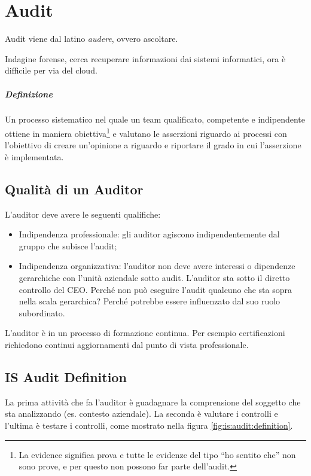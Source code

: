 \chapter{Audit}
\label{audit}

Audit viene dal latino \textit{audere}, ovvero ascoltare.

Indagine forense, cerca recuperare informazioni dai sistemi informatici, ora è
difficile per via del cloud.

\paragraph*{Definizione}

Un processo sistematico nel quale un team qualificato, competente e
indipendente ottiene in maniera obiettiva\footnote{La evidence significa prova e
tutte le evidenze del tipo ``ho sentito che'' non sono prove, e per questo non
possono far parte dell'audit.} e valutano le asserzioni riguardo ai processi
con l'obiettivo di creare un'opinione a riguardo e riportare il grado in cui
l'asserzione è implementata.


\section{Qualità di un Auditor}

L'auditor deve avere le seguenti qualifiche:
\begin{itemize}
\item Indipendenza professionale: gli auditor agiscono indipendentemente dal
gruppo che subisce l'audit;
\item Indipendenza organizzativa: l'auditor non deve avere interessi o
dipendenze gerarchiche con l'unità aziendale sotto audit. L'auditor sta sotto
il diretto controllo del CEO. Perché non può eseguire l'audit qualcuno che sta
sopra nella scala gerarchica? Perché potrebbe essere influenzato dal suo ruolo
subordinato.
\end{itemize}

L'auditor è in un processo di formazione continua. Per esempio certificazioni
richiedono continui aggiornamenti dal punto di vista professionale.

\section{IS Audit Definition}

La prima attività che fa l'auditor è guadagnare la comprensione del soggetto
che sta analizzando (es. contesto aziendale).
La seconda è valutare i controlli e l'ultima è testare i controlli, come
mostrato nella figura \ref{fig:is:audit:definition}.

